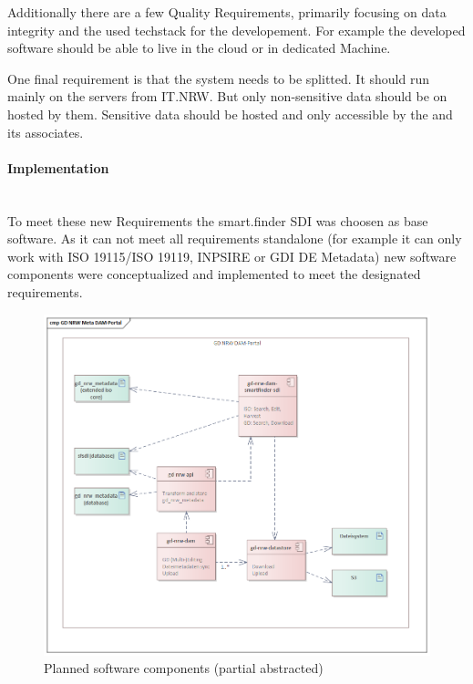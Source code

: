 \documentclass[11pt, titlepage, a4paper]{article}
\newcommand{\myparagraph}[1]{\paragraph{#1}\mbox{}\\}
\begin{document}
Additionally there are a few Quality Requirements, primarily focusing on data integrity and the used techstack for the developement. For example the developed software should be able to live in the cloud or in dedicated Machine.

One final requirement is that the system needs to be splitted. It should run mainly on the servers from IT.NRW. But only non-sensitive data should be on hosted by them. Sensitive data should  be hosted and only accessible by the  and its associates. 

\myparagraph{Implementation}
To meet these new Requirements the smart.finder SDI was choosen as base software. As it can not meet all requirements standalone (for example it can only work with ISO 19115/ISO 19119, INPSIRE or GDI DE Metadata) new software components were conceptualized and implemented to meet the designated requirements.

\begin{figure}[t]
	\caption{Planned software components (partial abstracted)}
	\label{fig:components}
	\includegraphics[width=16cm]{components.png}
	\centering
\end{figure}
\end{document}
